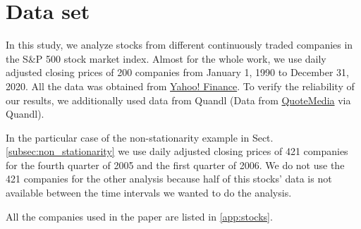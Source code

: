\section{Data set}\label{sec:data_set}

In this study, we analyze stocks from different continuously traded companies
in the S\&P 500 stock market index. Almost for the whole work, we use daily
adjusted closing prices of 200 companies from January 1, 1990 to December 31,
2020. All the data was obtained from
\href{https://finance.yahoo.com/}{Yahoo! Finance}. To verify the reliability of
our results, we additionally used data from Quandl \cite{Quandl} (Data from
\href{https://www.quandl.com/}{QuoteMedia} \cite{QuoteMedia} via Quandl).

In the particular case of the non-stationarity example in Sect.
\ref{subsec:non_stationarity} we use daily adjusted closing prices of 421
companies for the fourth quarter of 2005 and the first quarter of 2006. We do
not use the 421 companies for the other analysis because half of this stocks'
data is not available between the time intervals we wanted to do the analysis.

All the companies used in the paper are listed in  \ref{app:stocks}.
